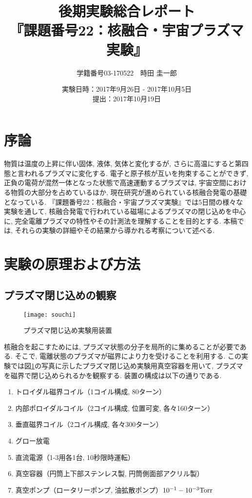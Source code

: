 \documentclass[]{jsarticle}
\title{後期実験総合レポート\\『課題番号22：核融合・宇宙プラズマ実験』}
\author{学籍番号03-170522　時田 圭一郎}
\date{実験日時：2017年9月26日 - 2017年10月5日\\
提出：2017年10月19日}
\begin{document}
\maketitle

\section{序論}
物質は温度の上昇に伴い固体, 液体, 気体と変化するが, さらに高温にすると第四態と言われるプラズマに変化する. 電子と原子核が互いを拘束することができず, 正負の電荷が混然一体となった状態で高速運動するプラズマは, 宇宙空間における物質の大部分を占めているほか, 現在研究が進められている核融合発電の基礎となっている. 『課題番号22：核融合・宇宙プラズマ実験』では5日間の様々な実験を通して, 核融合発電で行われている磁場によるプラズマの閉じ込めを中心に, 完全電離プラズマの特性やその計測法を理解することを目的とする. 本稿では, それらの実験の詳細やその結果から導かれる考察について述べる. 

\section{実験の原理および方法}
	\subsection{プラズマ閉じ込めの観察\label{day1} }
	
	\begin{figure}[htbp]
	\begin{center}
	\texttt{[image: souchi]}
	\caption{プラズマ閉じ込め実験用装置\cite{t}}
	\label{souchi}
	\end{center}
	\end{figure}
	
	核融合を起こすためには, プラズマ状態の分子を局所的に集めることが必要である. そこで, 電離状態のプラズマが磁界により力を受けることを利用する. この実験では図\ref{souchi}の写真に示したプラズマ閉じ込め実験用真空容器を用いて, プラズマを磁界で閉じ込められるかを観察する. 装置の構成は以下の通りである\cite{t}. 
	
	\begin{enumerate}
		\item トロイダル磁界コイル（1コイル構成, 80ターン）
		\item 内部ポロイダルコイル（2コイル構成, 位置可変, 各々160ターン）
		\item 垂直磁界コイル（2コイル構成, 各々300ターン）
		\item グロー放電
		\item 直流電源（1-3用各1台, 10秒限時運転）
		\item 真空容器（円筒上下部ステンレス製, 円筒側面部アクリル製）
		\item 真空ポンプ（ロータリーポンプ, 油拡散ポンプ）$10^{-1} - 10^{-3} \rm{Torr}$	
	\end{enumerate}
	
\end{document}
